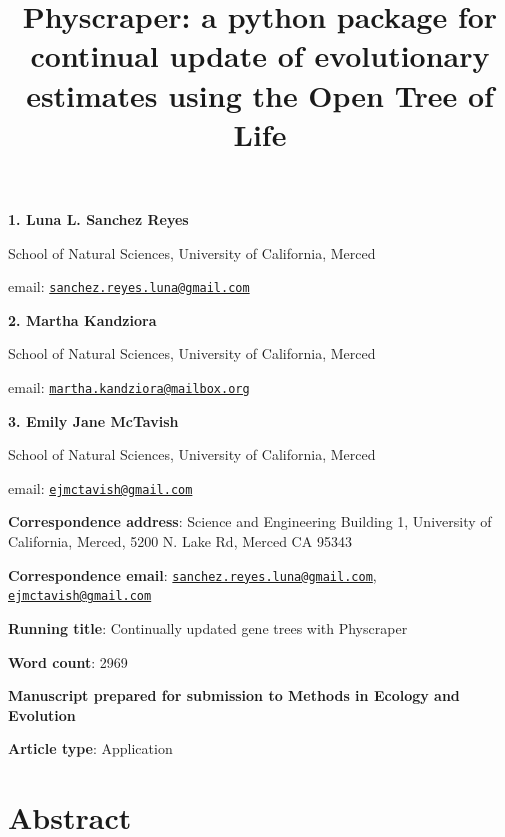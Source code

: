 \documentclass[]{article}
\title{Physcraper: a python package for continual update of evolutionary estimates using the Open Tree of Life}
\author{}
\date{\vspace{-2.5em}}
\begin{document}
\maketitle

\textbf{1. Luna L. Sanchez Reyes}

School of Natural Sciences, University of California, Merced

email: \href{mailto:sanchez.reyes.luna@gmail.com}{\nolinkurl{sanchez.reyes.luna@gmail.com}}

\textbf{2. Martha Kandziora}

School of Natural Sciences, University of California, Merced

email: \href{mailto:martha.kandziora@mailbox.org}{\nolinkurl{martha.kandziora@mailbox.org}}

\textbf{3. Emily Jane McTavish}

School of Natural Sciences, University of California, Merced

email: \href{mailto:ejmctavish@gmail.com}{\nolinkurl{ejmctavish@gmail.com}}

\textbf{Correspondence address}: Science and Engineering Building 1, University of California, Merced, 5200 N. Lake Rd, Merced CA 95343

\textbf{Correspondence email}: \href{mailto:sanchez.reyes.luna@gmail.com}{\nolinkurl{sanchez.reyes.luna@gmail.com}}, \href{mailto:ejmctavish@gmail.com}{\nolinkurl{ejmctavish@gmail.com}}

\textbf{Running title}: Continually updated gene trees with Physcraper

\textbf{Word count}: 2969

\textbf{Manuscript prepared for submission to Methods in Ecology and Evolution}

\textbf{Article type}: Application

\newpage

\hypertarget{abstract}{%
\section{Abstract}\label{abstract}}
\end{document}
